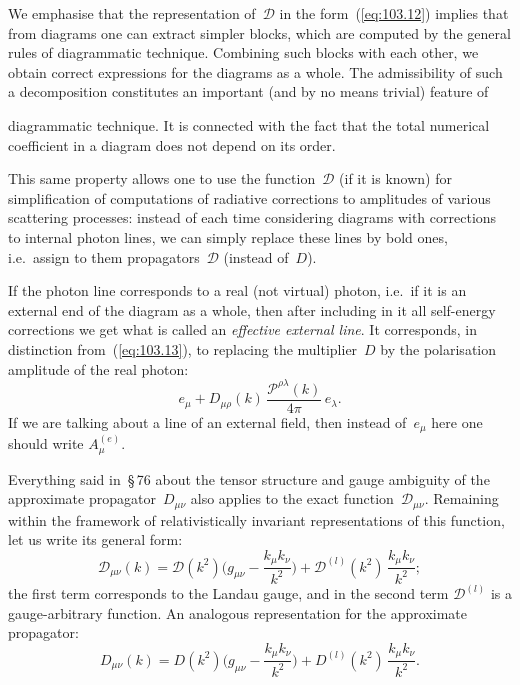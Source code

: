 We emphasise that the representation of~$\mathcal{D}$ in the form~(\ref{eq:103.12}) implies that from diagrams one can extract simpler blocks, which are computed by the general rules of diagrammatic technique. Combining such blocks with each other, we obtain correct expressions for the diagrams as a whole. The admissibility of such a decomposition constitutes an important (and by no means trivial) feature of


\noindent diagrammatic technique. It is connected with the fact that the total numerical coefficient in a diagram does not depend on its order.

This same property allows one to use the function~$\mathcal{D}$ (if it is known) for simplification of computations of radiative corrections to amplitudes of various scattering processes: instead of each time considering diagrams with corrections to internal photon lines, we can simply replace these lines by bold ones, i.e.\ assign to them propagators~$\mathcal{D}$ (instead of~$D$).

If the photon line corresponds to a real (not virtual) photon, i.e.\ if it is an external end of the diagram as a whole, then after including in it all self-energy corrections we get what is called an \emph{effective external line}. It corresponds, in distinction from~(\ref{eq:103.13}), to replacing the multiplier~$D$ by the polarisation amplitude of the real photon:
\begin{equation}
e_\mu + D_{\mu\rho}(k)\,\frac{\mathcal{P}^{\rho\lambda}(k)}{4\pi}\,e_\lambda.
\label{eq:103.15}
\end{equation}
If we are talking about a line of an external field, then instead of~$e_\mu$ here one should write $A^{(e)}_\mu$.

Everything said in~\S\,76 about the tensor structure and gauge ambiguity of the approximate propagator~$D_{\mu\nu}$ also applies to the exact function~$\mathcal{D}_{\mu\nu}$. Remaining within the framework of relativistically invariant representations of this function, let us write its general form:
\begin{equation}
\mathcal{D}_{\mu\nu}(k) = \mathcal{D}(k^2)\biggl(g_{\mu\nu} - \frac{k_\mu k_\nu}{k^2}\biggr) + \mathcal{D}^{(l)}(k^2)\,\frac{k_\mu k_\nu}{k^2};
\label{eq:103.16}
\end{equation}
the first term corresponds to the Landau gauge, and in the second term $\mathcal{D}^{(l)}$ is a gauge-arbitrary function. An analogous representation for the approximate propagator:
\begin{equation}
D_{\mu\nu}(k) = D(k^2)\biggl(g_{\mu\nu} - \frac{k_\mu k_\nu}{k^2}\biggr) + D^{(l)}(k^2)\,\frac{k_\mu k_\nu}{k^2}.
\label{eq:103.17}
\end{equation}


